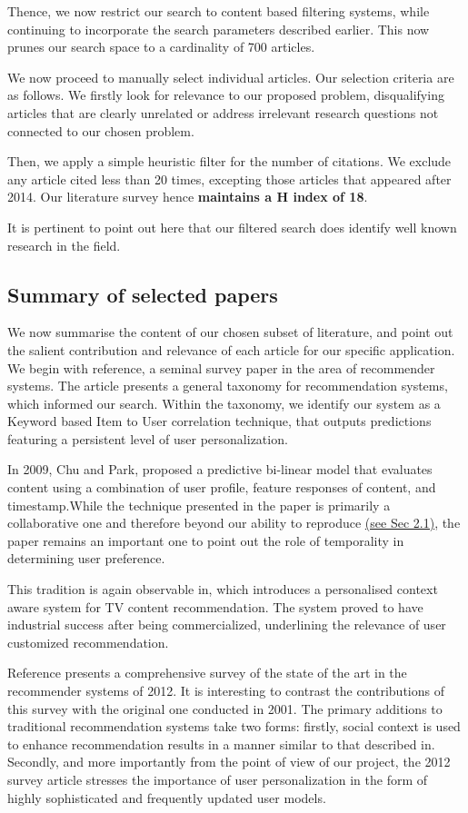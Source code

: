 \documentclass{sig-alternate-05-2015}
\begin{document}
Thence, we now restrict our search to content based filtering systems, while continuing to incorporate the search parameters described earlier. This now prunes our search space to a cardinality of 700 articles.

We now proceed to manually select individual articles. Our selection criteria are as follows. We firstly look for relevance to our proposed problem, disqualifying articles that are clearly unrelated or address irrelevant research questions not connected to our chosen problem. 

Then, we apply a simple heuristic filter for the number of citations. We exclude any article cited less than 20 times, excepting those articles that appeared after 2014. Our literature survey hence \textbf{maintains a H index of 18}.

It is pertinent to point out here that our filtered search does identify well known research in the field\cite{14,17}.

\subsection{Summary of selected papers}
We now summarise the content of our chosen subset of literature, and point out the salient contribution and relevance of each article for our specific application. We begin with reference\cite{14}, a seminal survey paper in the area of recommender systems. The article presents a general taxonomy for recommendation systems, which informed our search. Within the taxonomy, we identify our system as a Keyword based Item to User correlation technique, that outputs predictions featuring a persistent level of user personalization.

In 2009, Chu and Park\cite{15}, proposed a predictive bi-linear model that evaluates content using a combination of user profile, feature responses of content, and timestamp.While the technique presented in the paper is primarily a collaborative one and therefore beyond our ability to reproduce \hyperref[lit]{(see Sec 2.1)}, the paper remains an important one to point out the role of temporality in determining user preference. 

This tradition is again observable in\cite{16}, which introduces a personalised context aware system for TV content recommendation. The system proved to have industrial success after being commercialized, underlining the relevance of user customized recommendation.

Reference\cite{17} presents a comprehensive survey of the state of the art in the recommender systems of 2012. It is interesting to contrast the contributions of this survey with the original one conducted in 2001. The primary additions to traditional recommendation systems take two forms: firstly, social context is used to enhance recommendation results in a manner similar to that described in\cite{16}. Secondly, and more importantly from the point of view of our project, the 2012 survey article stresses the importance of user personalization in the form of highly sophisticated and frequently updated user models.
\end{document}
